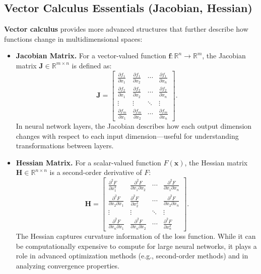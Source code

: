 \subsection{Vector Calculus Essentials (Jacobian, Hessian)}
\noindent
\textbf{Vector calculus} provides more advanced structures that further describe how functions change in multidimensional spaces:

\begin{itemize}
    \item \textbf{Jacobian Matrix.}
    For a vector-valued function $\mathbf{f}: \mathbb{R}^n \rightarrow \mathbb{R}^m$, the Jacobian matrix $\mathbf{J} \in \mathbb{R}^{m \times n}$ is defined as:
    \[
    \mathbf{J} = 
    \begin{bmatrix}
    \frac{\partial f_1}{\partial x_1} & \frac{\partial f_1}{\partial x_2} & \cdots & \frac{\partial f_1}{\partial x_n} \\
    \frac{\partial f_2}{\partial x_1} & \frac{\partial f_2}{\partial x_2} & \cdots & \frac{\partial f_2}{\partial x_n} \\
    \vdots & \vdots & \ddots & \vdots \\
    \frac{\partial f_m}{\partial x_1} & \frac{\partial f_m}{\partial x_2} & \cdots & \frac{\partial f_m}{\partial x_n}
    \end{bmatrix}.
    \]
    In neural network layers, the Jacobian describes how each output dimension changes with respect to each input dimension—useful for understanding transformations between layers.

    \item \textbf{Hessian Matrix.}
    For a scalar-valued function $F(\mathbf{x})$, the Hessian matrix $\mathbf{H} \in \mathbb{R}^{n \times n}$ is a second-order derivative of $F$:
    \[
    \mathbf{H} =
    \begin{bmatrix}
    \frac{\partial^2 F}{\partial x_1^2} & \frac{\partial^2 F}{\partial x_1 \partial x_2} & \cdots & \frac{\partial^2 F}{\partial x_1 \partial x_n} \\
    \frac{\partial^2 F}{\partial x_2 \partial x_1} & \frac{\partial^2 F}{\partial x_2^2} & \cdots & \frac{\partial^2 F}{\partial x_2 \partial x_n} \\
    \vdots & \vdots & \ddots & \vdots \\
    \frac{\partial^2 F}{\partial x_n \partial x_1} & \frac{\partial^2 F}{\partial x_n \partial x_2} & \cdots & \frac{\partial^2 F}{\partial x_n^2}
    \end{bmatrix}.
    \]
    The Hessian captures curvature information of the loss function. While it can be computationally expensive to compute for large neural networks, it plays a role in advanced optimization methods (e.g., second-order methods) and in analyzing convergence properties.

\end{itemize}

